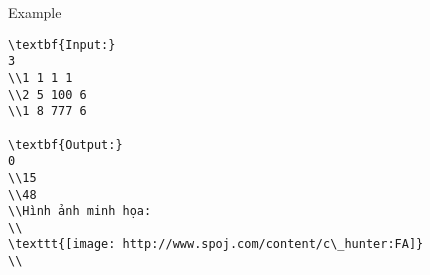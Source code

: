 Example
\begin{verbatim}
\textbf{Input:}
3
\\1 1 1 1
\\2 5 100 6
\\1 8 777 6

\textbf{Output:}
0
\\15
\\48
\\Hình ảnh minh họa:
\\
\texttt{[image: http://www.spoj.com/content/c\_hunter:FA]} 
\\\end{verbatim}